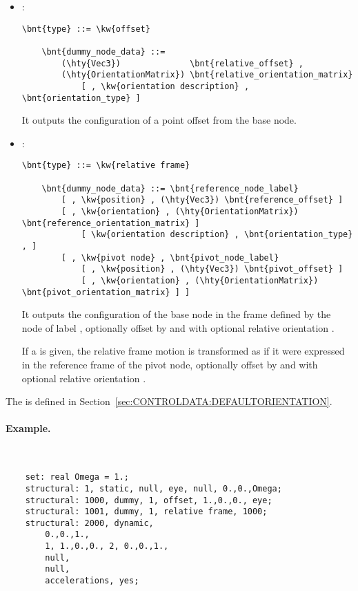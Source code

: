 \begin{itemize}
    \item {}:
\begin{Verbatim}[commandchars=\\\{\}]
    \bnt{type} ::= \kw{offset}

    \bnt{dummy_node_data} ::=
        (\hty{Vec3})              \bnt{relative_offset} ,
        (\hty{OrientationMatrix}) \bnt{relative_orientation_matrix}
            [ , \kw{orientation description} , \bnt{orientation_type} ]
\end{Verbatim}
    It outputs the configuration of a point offset from the base node.
            
    \item {}:
\begin{Verbatim}[commandchars=\\\{\}]
    \bnt{type} ::= \kw{relative frame}

    \bnt{dummy_node_data} ::= \bnt{reference_node_label}
        [ , \kw{position} , (\hty{Vec3}) \bnt{reference_offset} ]
        [ , \kw{orientation} , (\hty{OrientationMatrix}) \bnt{reference_orientation_matrix} ]
            [ \kw{orientation description} , \bnt{orientation_type} , ]
        [ , \kw{pivot node} , \bnt{pivot_node_label}
            [ , \kw{position} , (\hty{Vec3}) \bnt{pivot_offset} ]
            [ , \kw{orientation} , (\hty{OrientationMatrix}) \bnt{pivot_orientation_matrix} ] ]
\end{Verbatim}
    It outputs the configuration of the base node in the frame defined
    by the node of label , optionally offset 
    by  and with optional relative orientation 
    .

    If a  is given, the relative frame motion
    is transformed as if it were expressed in the reference frame
    of the pivot node, optionally offset by 
    and with optional relative orientation .
\end{itemize}
The  is defined
in Section~\ref{sec:CONTROLDATA:DEFAULTORIENTATION}.

\paragraph{Example.} \
\begin{verbatim}
    set: real Omega = 1.;
    structural: 1, static, null, eye, null, 0.,0.,Omega;
    structural: 1000, dummy, 1, offset, 1.,0.,0., eye;
    structural: 1001, dummy, 1, relative frame, 1000;
    structural: 2000, dynamic,
        0.,0.,1.,
        1, 1.,0.,0., 2, 0.,0.,1.,
        null,
        null,
        accelerations, yes;
\end{verbatim}

